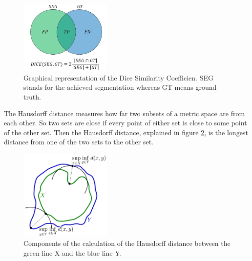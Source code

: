 \documentclass[journal]{IEEEtran}
\begin{document}
	\begin{figure}[h]
		\centering
		\includegraphics[width=0.4\textwidth]{diceGraphics}
		\caption{Graphical representation of the Dice Similarity Coefficien. SEG stands for the achieved segmentation whereas GT means ground truth.}
		\label{fig:e2}
	\end{figure}

	The Hausdorff distance measures how far two subsets of a metric space are from each other. So two sets are close if every point of either set is close 
	to some point of the other set. Then the Hausdorff distance, explained in figure \ref{fig:e3}, is the longest distance from one of the two sets to the other set.

	\begin{figure}[h]
		\centering
		\includegraphics[width=0.4\textwidth]{haussdorfGraphics}
		\caption{Components of the calculation of the Hausdorff distance between the green line X and the blue line Y.}
		\label{fig:e3}
	\end{figure}


\end{document}
